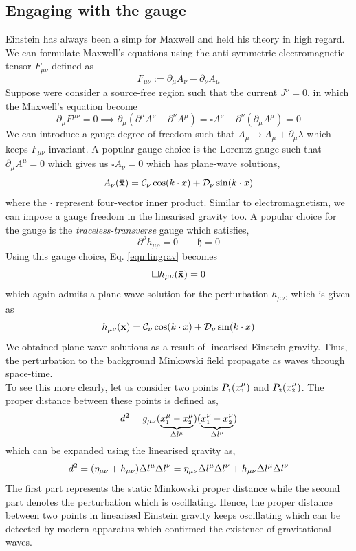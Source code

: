 \subsection{Engaging with the gauge}
Einstein has always been a simp for Maxwell and held his theory in high regard. We can formulate Maxwell's equations using the anti-symmetric electromagnetic tensor $F_{\mu\nu}$ defined as
$$F_{\mu\nu}:= \partial_\mu A_\nu - \partial_\nu A_\mu$$
Suppose were consider a source-free region such that the current $J^\nu =0 $, in which the Maxwell's equation become
$$\partial_\mu F^{\mu\nu} = 0 \implies \partial_\mu ( \partial^\mu A^\nu - \partial^\nu A^\mu) = \square A^\nu - \partial^\nu (\partial_\mu A^\mu) = 0 $$
We can introduce a gauge degree of freedom such that $A_\mu \longrightarrow A_\mu + \partial_\mu \lambda$ which keeps $F_{\mu\nu}$ invariant. A popular gauge choice is the Lorentz gauge such that $\partial_\mu A^\mu = 0$ which gives us $\square A_\nu =0$ which has plane-wave solutions,
$$A_\nu (\vb{\bar{x}}) = \mathcal C_\nu \cos (k\cdot x) + \mathcal D_\nu\sin(k\cdot x)$$
where the $\cdot$ represent four-vector inner product. Similar to electromagnetism, we can impose a gauge freedom in the linearised gravity too. A popular choice for the gauge is the \textit{traceless-transverse} gauge which satisfies,
$$\partial^\rho h_{\mu \rho} = 0\qquad \mathfrak{h} =0$$
Using this gauge choice, Eq. \ref{eqn:lingrav} becomes
$$\square h_{\mu\nu}(\vb{\bar{x}})=0$$
which again admits a plane-wave solution for the perturbation $h_{\mu\nu}$, which is given as
$$h_{\mu\nu}(\vb{\bar{x}}) = \mathcal C_\nu \cos (k\cdot x) + \mathcal D_\nu\sin(k\cdot x)$$
We obtained plane-wave solutions as a result of linearised Einstein gravity. Thus, the perturbation to the background Minkowski field propagate as waves through space-time. \\[0.2cm]
To see this more clearly, let us consider two points $P_{\text{\tiny 1}} (x_{\text{\tiny 1}}^\mu)$ and $P_{\text{\tiny 2}}(x_{\text{\tiny 2}}^\mu)$. The proper distance between these points is defined as,
$$d^2 = g_{\mu\nu} (\underbrace{x_{\text{\tiny 1}}^\mu -x_{\text{\tiny 2}}^\mu}_{\Delta l^\mu}) (\underbrace{x_{\text{\tiny 1}}^\nu -x_{\text{\tiny 2}}^\nu}_{\Delta l^\nu})$$
which can be expanded using the linearised gravity as,
$$d^2 = \qty(\eta_{\mu\nu} + h_{\mu\nu}) \Delta l^\mu \Delta l^\nu = \eta_{\mu\nu}  \Delta l^\mu \Delta l^\nu+h_{\mu\nu} \Delta l^\mu \Delta l^\nu$$
The first part represents the static Minkowski proper distance while the second part denotes the perturbation which is oscillating. Hence, the proper distance between two points in linearised Einstein gravity keeps oscillating which can be detected by modern apparatus which confirmed the existence of gravitational waves. 